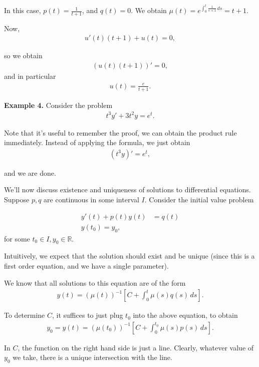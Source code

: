 \documentclass{article}
\begin{document}
In this case, $p(t) = \frac{1}{t+1}$, and $q(t) = 0$.  We obtain $\mu(t) =  e^{\int_{0}^{t} \frac{1}{s+1} \, ds} = t+1$.

Now,
\begin{align*}
  u'(t) (t+1) + u(t) = 0,
\end{align*}

so we obtain
\begin{align*} 
  (u(t) (t+1))' = 0,
\end{align*}
and in particular
\begin{align*}
  u(t) = \frac{c}{t+1}.
\end{align*}

{\bf Example 4.} Consider the problem
\begin{align*}
  t^3 y' + 3t^2 y = e^t.
\end{align*}

Note that it's useful to remember the proof, we can obtain the product rule immediately.  Instead of applying the formula, we just obtain
\begin{align*}
  (t^3 y)' = e^t, 
\end{align*}

and we are done.

We'll now discuss existence and uniqueness of solutions to differential equations.  Suppose $p, q$ are continuous in some interval $I$.  Consider the initial value problem

\begin{align*}
  y'(t) + p(t) y(t) &= q(t) \\
  y(t_0) = y_0,
\end{align*}
for some $t_0 \in I, y_0 \in \mathbb{R}$.

Intuitively, we expect that the solution should exist and be unique (since this is a first order equation, and we have a single parameter).

We know that all solutions to this equation are of the form
\begin{align*}
  y(t) = \left( \mu(t) \right)^{-1} \left[ C + \int_{0}^{t} \mu(s) q(s) \, ds \right].
\end{align*}

To determine $C$, it suffices to just plug $t_0$ into the above equation, to obtain
\begin{align*}
  y_0 = y(t) = \left( \mu(t_0) \right)^{-1} \left[ C + \int_{0}^{t_0} \mu(s) p(s) \, ds \right].
\end{align*}

In $C$, the function on the right hand side is just a line.  Clearly, whatever value of $y_0$ we take, there is a unique intersection with the line.
\end{document}
